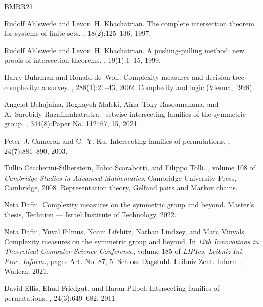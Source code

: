 \documentclass[10pt,a4paper]{amsart}
\theoremstyle{definition}
\begin{document}
\newcommand{\etalchar}[1]{$^{#1}$}
\begin{thebibliography}{BMRR21}

Rudolf Ahlswede and Levon~H. Khachatrian.
\newblock The complete intersection theorem for systems of finite sets.
, 18(2):125--136, 1997.

Rudolf Ahlswede and Levon~H. Khachatrian.
\newblock A pushing-pulling method: new proofs of intersection theorems.
, 19(1):1--15, 1999.

Harry Buhrman and Ronald de~Wolf.
\newblock Complexity measures and decision tree complexity: a survey.
, 288(1):21--43, 2002.
\newblock Complexity and logic (Vienna, 1998).

Angelot Behajaina, Roghayeh Maleki, Aina~Toky Rasoamanana, and A.~Sarobidy
  Razafimahatratra.
-setwise intersecting families of the symmetric group.
, 344(8):Paper No. 112467, 15, 2021.

Peter~J. Cameron and C.~Y. Ku.
\newblock Intersecting families of permutations.
, 24(7):881--890, 2003.

Tullio Ceccherini-Silberstein, Fabio Scarabotti, and Filippo Tolli.
, volume 108 of {\em
  Cambridge Studies in Advanced Mathematics}.
\newblock Cambridge University Press, Cambridge, 2008.
\newblock Representation theory, Gelfand pairs and Markov chains.

Neta Dafni.
\newblock Complexity measures on the symmetric group and beyond.
\newblock Master's thesis, Technion --- Israel Institute of Technology, 2022.

\bibitem[DFL{\etalchar{+}}21]{DFLLV}
Neta Dafni, Yuval Filmus, Noam Lifshitz, Nathan Lindzey, and Marc Vinyals.
\newblock Complexity measures on the symmetric group and beyond.
\newblock In {\em 12th {I}nnovations in {T}heoretical {C}omputer {S}cience
  {C}onference}, volume 185 of {\em LIPIcs. Leibniz Int. Proc. Inform.}, pages
  Art. No. 87, 5. Schloss Dagstuhl. Leibniz-Zent. Inform., Wadern, 2021.

David Ellis, Ehud Friedgut, and Haran Pilpel.
\newblock Intersecting families of permutations.
, 24(3):649--682, 2011.


\end{thebibliography}
\end{document}
